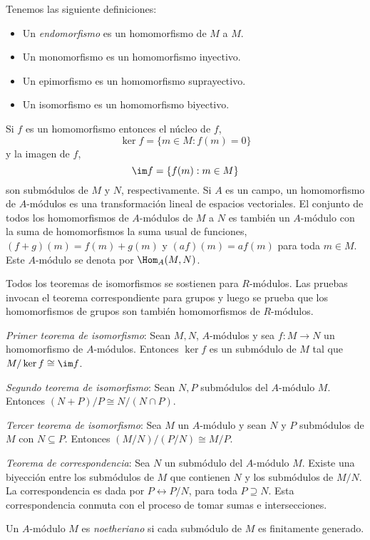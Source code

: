 Tenemos las siguiente definiciones: 
\begin{itemize}
  \item Un \emph{endomorfismo} es un homomorfismo de $M$ a $M$.
  \item Un monomorfismo es un homomorfismo inyectivo.
  \item Un epimorfismo es un homomorfismo suprayectivo.
  \item Un isomorfismo es un homomorfismo biyectivo.
\end{itemize}

Si $f$ es un homomorfismo entonces el núcleo de $f$,
  \[
    \ker f = \{m \in M : f(m) = 0\}
  \]
y la imagen de $f$,
  \[
    \im f = \{f(m) : m \in M\}
  \]
son submódulos de $M$ y $N$, respectivamente. Si $A$ es un campo, un homomorfismo de $A$-módulos es una transformación lineal de espacios vectoriales. El conjunto de todos los homomorfismos de $A$-módulos de $M$ a $N$ es también un $A$-módulo con la suma de homomorfismos la suma usual de funciones, $(f+g)(m) = f(m) + g(m)$ y $(af)(m) = af(m)$ para toda $m \in M$. Este $A$-módulo se denota por $\Hom_A(M,N)$.

Todos los teoremas de isomorfismos se sostienen para $R$-módulos. Las pruebas invocan el teorema correspondiente para grupos y luego se prueba que los homomorfismos de grupos son también homomorfismos de $R$-módulos.

\emph{Primer teorema de isomorfismo}: Sean $M,N$, $A$-módulos y sea $f\colon M \to N$ un homomorfismo de $A$-módulos. Entonces $\ker f$ es un submódulo de $M$ tal que $M/\ker f \cong \im f$.

\emph{Segundo teorema de isomorfismo}: Sean $N,P$ submódulos del $A$-módulo $M$. Entonces $(N+P)/P \cong N/(N \cap P)$.

\emph{Tercer teorema de isomorfismo}: Sea $M$ un $A$-módulo y sean $N$ y $P$ submódulos de $M$ con $N \subseteq P$. Entonces $(M/N)/(P/N) \cong M/P$.

\emph{Teorema de correspondencia}: Sea $N$ un submódulo del $A$-módulo $M$. Existe una biyección entre los submódulos de $M$ que contienen $N$ y los submódulos de $M/N$. La correspondencia es dada por $P \leftrightarrow P/N$, para toda $P \supseteq N$. Esta correspondencia conmuta con el proceso de tomar sumas e intersecciones.

\begin{definition}
  Un $A$-módulo $M$ es \emph{noetheriano} si cada submódulo de $M$ es finitamente generado.
\end{definition}

